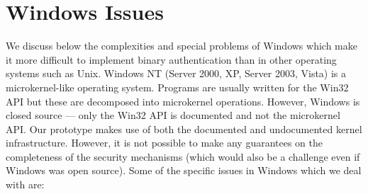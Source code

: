\section{Windows Issues}
\label{sect:windows}

We discuss below the complexities and special problems of
Windows which make it more difficult to implement binary authentication
than in other operating systems such as Unix.
Windows NT (Server 2000, XP, Server 2003, Vista) is a microkernel-like
operating system. 
Programs are usually written for the Win32 API but these are
decomposed into microkernel operations. 
However, Windows is closed source --- only the Win32 API is documented
and not the microkernel API.
Our prototype makes use of both the documented and undocumented
kernel infrastructure. However, it is not possible to make any guarantees
on the completeness of the security mechanisms
(which would also be a challenge even if Windows was open source).
Some of the specific issues in Windows which we deal with are:
